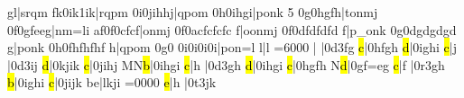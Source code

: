 \Notes\fl g\tbsqh l|\motif srqm\enotes
%
\changecontexte
\Notes\zq f\qu k\sk\Ibu0ik1\bsqh i\tbsqh k|\Motif rqpm\enotes
\temps\Notes\ibu0i0\bsqh j\bsqh i\fl h\bsqh h\tbsqh j|\Motif qpom\enotes
%
\xbarre\Notes\ibu0h0\bsqh i\bsqh h\bsqh g\tbsqh i|\Motif ponk\enotes
{}5{\lppage}\noautolines
\zalaligne\Notes\ibu0g0\bsqh h\bsqh g\bsqh f\tbsqh h|\octline t\Motif onmj\enotes
\xbarre\Notes\ibu0f0\bsqh g\bsqh f\na e\bsqh e\tbsqh g|\Motif nm{=l}i\enotes
\temps\Notes\zq a\qu f\sk\ibu0f0\zq c\bsqh f\zq c\tbsqh f|\Motif onmj\enotes
\xbarre\Notes\ibu0f0\na a\zq c\bsqh f\zq c\bsqh f\zq c\bsqh f\zq c\tbsqh
f|\na o\Motif onmj\enotes
\temps\Notes\ibu0f0\zq d\bqqh f\zq d\bqqh f\zq d\bqqh f\zq d\tbqqh
f|\Motif p{_o}nk\enotes
\xbarre\Notes\ibu0g0\zq d\bsqh g\zq d\bsqh g\zq d\bsqh g\zq d\tbsqh
g|\Motif ponk\enotes
\temps\Notes\ibu0h0\zq f\bsqh h\zq f\bsqh h\zq f\bsqh h\zq f\tbsqh
h|\Motif qpom\enotes
\xbarre\Notes\ibu0g0\relax
{}\qh0i\qh0i\qh0i\tqh0i|\Motif pon{=l}\enotes
\nspace\NOtes\pointdorgue l\hpause|\pointdorgue l\hpause\enotes
 \suspmorceau
\eject
\relax\cleftoksi={{6}{0}{0}{0}}%
\relax
{}\relax{}\relax
\generalmeter{\allabreve}\reprmorceau
\savemeters\saveclefs
\notes{}|\soupir\enotes
\temps\notes\hpause|\Ilegl0d\dqh3fg\enotes
\temps\notes{}\hl c|\qqh0hfgh\enotes
\barre\notes{}\hl d|\qqh0ighi\enotes
\temps\notes{}\hl c|\qu j\sk\enotes
\temps\notes|\Ilegl0d\dqh3ij\enotes
\barre\notes{}\hl d|\qqh0kjik\enotes
\temps\notes{}\hl c|\qqh0jihj\enotes
\barre\notes\zh M\lh N\hl b|\qqh0ihgi\enotes
\temps\notes{}\hl c|\qu h\enotes
\temps\notes|\Ilegl0d\dqh3gh\enotes
\barre\notes{}\hl d|\qqh0ihgi\enotes
\temps\notes{}\hl c|\qqh0hgfh\enotes
\barre\notes{}\lh N\hl d|\qqh0gf{=e}g\enotes
\temps\notes{}\hl c|\qu f\sk\enotes
\temps\notes|\Ilegu0r\dqh3gh\enotes
\barre\notes{}\hl b|\qqh0ighi\enotes
\temps\notes{}\hl c|\qqh0jijk\enotes
\barre\notes\zh b\bohl e|lkji\enotes
\cleftoksi={{0}{0}{0}{0}}\changeclefs
\temps\notes{}\hl e|\qu h\sk\enotes
\temps\notes|\Ilegu0t\dqh3jk\enotes
